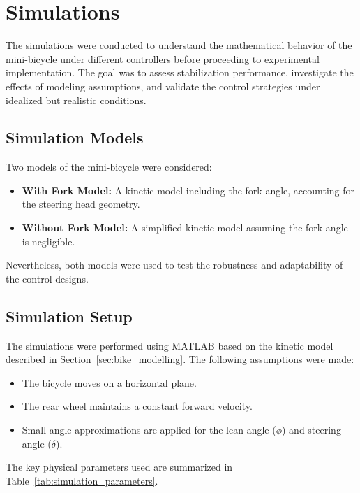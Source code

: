 \chapter{Simulations}
\label{chap:simulations}

The simulations were conducted to understand the mathematical behavior of the mini-bicycle under different controllers before proceeding to experimental implementation.
The goal was to assess stabilization performance, investigate the effects of modeling assumptions, and validate the control strategies under idealized but realistic conditions.

\section{Simulation Models}

Two models of the mini-bicycle were considered:
\begin{itemize}
	\item \textbf{With Fork Model:} A kinetic model including the fork angle, accounting for the steering head geometry.
	\item \textbf{Without Fork Model:} A simplified kinetic model assuming the fork angle is negligible.
\end{itemize}

Nevertheless, both models were used to test the robustness and adaptability of the control designs.

\section{Simulation Setup}

The simulations were performed using MATLAB based on the kinetic model described in Section~\ref{sec:bike_modelling}.
The following assumptions were made:
\begin{itemize}
	\item The bicycle moves on a horizontal plane.
	\item The rear wheel maintains a constant forward velocity.
	\item Small-angle approximations are applied for the lean angle ($\phi$) and steering angle ($\delta$).
\end{itemize}

The key physical parameters used are summarized in Table~\ref{tab:simulation_parameters}.

